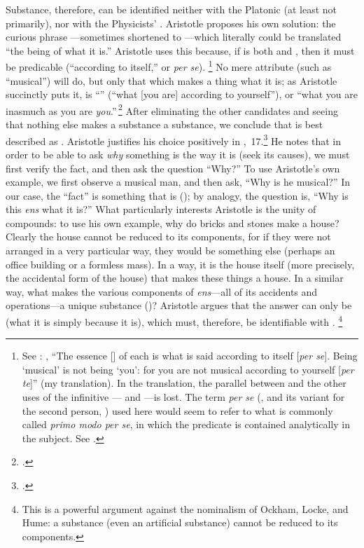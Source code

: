 Substance, therefore, can be identified neither with the Platonic  (at least not primarily), nor with the Physicists' . Aristotle proposes his own solution: the curious phrase ---sometimes shortened to ---which literally could be translated ``the being of what it is.'' Aristotle uses this because, if  is both  and , then it must be predicable  (``according to itself,'' or \emph{per se}).%
%
\footnote{See \cite[,~3, 1029b14-15]{aristotle:metaphysics}: , ``The essence [] of each is what is said according to itself [\emph{per se}]. Being `musical' is not being `you': for you are not musical according to yourself [\emph{per te}]'' (my translation). In the translation, the parallel between  and the other uses of the infinitive --- and ---is lost. The term \emph{per se} (, and its variant for the second person, ) used here would seem to refer to what is commonly called \emph{primo modo per se}, in which the predicate is contained analytically in the subject. See \cite[I,~10]{st:post-anal}.}
%
No mere attribute (such as ``musical'') will do, but only that which makes a thing what it is; as Aristotle succinctly puts it,  is ``'' (``what [you are] according to yourself''), or ``what you are inasmuch as you are \emph{you}.''\,\footcite[,~3, 1029b16]{aristotle:metaphysics} After eliminating the other candidates and seeing that nothing else makes a substance a substance, we conclude that  is best described as . Aristotle justifies his choice positively in ,~17.\footcite[See][,~17, 1041a5--1041b31]{aristotle:metaphysics} He notes that in order to be able to ask \emph{why} something is the way it is (seek its causes), we must first verify the fact, and then ask the question ``Why?'' To use Aristotle's own example, we first observe a musical man, and then ask, ``Why is he musical?'' In our case, the ``fact'' is something that is (); by analogy, the question is, ``Why is this \emph{ens} what it is?'' What particularly interests Aristotle is the unity of compounds: to use his own example, why do bricks and stones make a house? Clearly the house cannot be reduced to its components, for if they were not arranged in a very particular way, they would be something else (perhaps an office building or a formless mass). In a way, it is the house itself (more precisely, the accidental form of the house) that makes these things a house. In a similar way, what makes the various components of \emph{ens}---all of its accidents and operations---a unique substance ()? Aristotle argues that the answer can only be  (what it is simply because it is), which must, therefore, be identifiable with .%
%
\footnote{This is a powerful argument against the nominalism of Ockham, Locke, and Hume: a substance (even an artificial substance) cannot be reduced to its components.}

